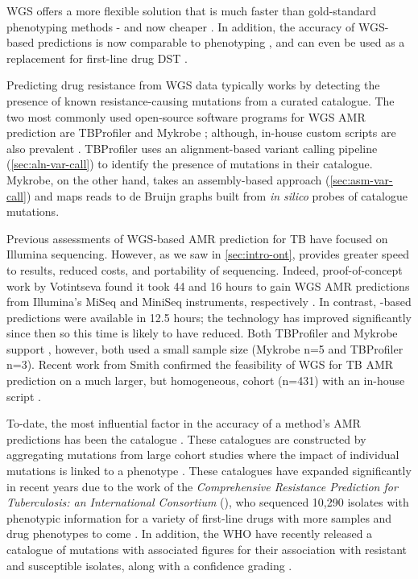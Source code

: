 WGS offers a more flexible solution that is much faster than gold-standard phenotyping methods - and now cheaper \cite{Pankhurst2016,Votintseva2015,Votintseva2017}. In addition, the accuracy of WGS-based predictions is now comparable to phenotyping \cite{hunt2019,walker2015,bradley2015,Pankhurst2016,Votintseva2015}, and can even be used as a replacement for first-line drug DST \cite{cryptic2018}. 

Predicting drug resistance from WGS data typically works by detecting the presence of known resistance-causing mutations from a curated catalogue. The two most commonly used open-source software programs for WGS AMR prediction are TBProfiler \cite{coll2015,phelan2019} and Mykrobe \cite{bradley2015,hunt2019}; although, in-house custom scripts are also prevalent \cite{smith2020,cryptic2018}. TBProfiler uses an alignment-based variant calling pipeline (\autoref{sec:aln-var-call}) to identify the presence of mutations in their catalogue. Mykrobe, on the other hand, takes an assembly-based approach (\autoref{sec:asm-var-call}) and maps reads to de Bruijn graphs built from \textit{in silico} probes of catalogue mutations. 

Previous assessments of WGS-based AMR prediction for TB have focused on Illumina sequencing. However, as we saw in \autoref{sec:intro-ont}, \ont{} provides greater speed to results, reduced costs, and portability of sequencing. Indeed, proof-of-concept work by Votintseva \etal{} found it took 44 and 16 hours to gain WGS AMR predictions from Illumina's MiSeq and MiniSeq instruments, respectively \cite{Votintseva2017}. In contrast, \ont{}-based predictions were available in 12.5 hours; the technology has improved significantly since then so this time is likely to have reduced. Both TBProfiler and Mykrobe support \ont{}, however, both used a small sample size (Mykrobe n=5 and TBProfiler n=3). Recent work from Smith \etal{} confirmed the feasibility of \ont{} WGS for TB AMR prediction on a much larger, but homogeneous, cohort (n=431) with an in-house script \cite{smith2020}.

To-date, the most influential factor in the accuracy of a method's AMR predictions has been the catalogue \cite{hunt2019}. These catalogues are constructed by aggregating mutations from large cohort studies where the impact of individual mutations is linked to a phenotype \cite{hunt2019,miotto2017,phelan2019}. These catalogues have expanded significantly in recent years due to the work of the \emph{Comprehensive Resistance Prediction for Tuberculosis: an International Consortium} (\cryptic{}), who sequenced 10,290 isolates with phenotypic information for a variety of first-line drugs \cite{cryptic2018} with more samples and drug phenotypes to come \cite{Votintseva2015}. In addition, the WHO have recently released a catalogue of mutations with associated figures for their association with resistant and susceptible isolates, along with a confidence grading \cite{whopanel2021}.


